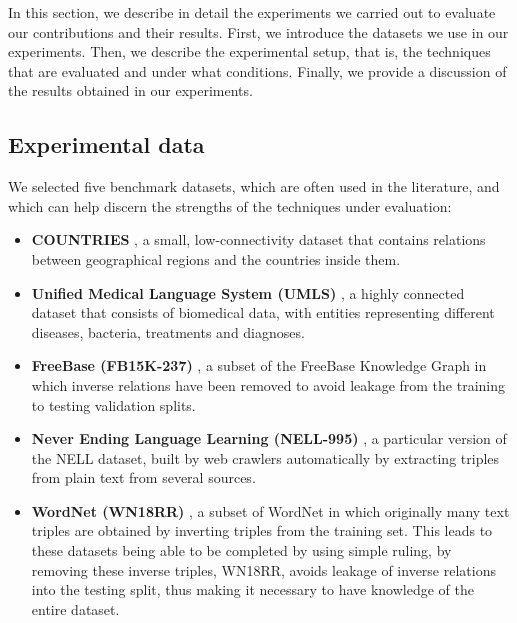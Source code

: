 In this section, we describe in detail the experiments we carried out to evaluate our contributions and their results. First, we introduce the datasets we use in our experiments. Then, we describe the experimental setup, that is, the techniques that are evaluated and under what conditions. Finally, we provide a discussion of the results obtained in our experiments.


\subsection{Experimental data}

We selected five benchmark datasets, which are often used in the literature, and which can help discern the strengths of the techniques under evaluation:

\begin{itemize}
    \item \textbf{COUNTRIES}
    , a small, low-connectivity dataset that contains relations between geographical regions and the countries inside them.
    
    \item \textbf{Unified Medical Language System (UMLS)}
    , a highly connected dataset that consists of biomedical data, with entities representing different diseases, bacteria, treatments and diagnoses.
    
    \item \textbf{FreeBase (FB15K-237)}
    , a subset of the FreeBase Knowledge Graph in which inverse relations have been removed to avoid leakage from the training to testing validation splits.
    
    \item \textbf{Never Ending Language Learning (NELL-995)}
    , a particular version of the NELL dataset, built by web crawlers automatically by extracting triples from plain text from several sources.
    
    \item \textbf{WordNet (WN18RR)}
    , a subset of WordNet in which originally many text triples are obtained by inverting triples from the training set.
    This leads to these datasets being able to be completed by using simple ruling, by removing these inverse triples, WN18RR, avoids leakage of inverse relations into the testing split, thus making it necessary to have knowledge of the entire dataset.
\end{itemize}

